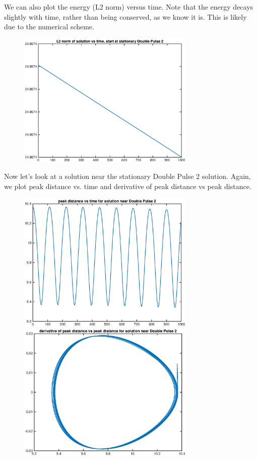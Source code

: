 \documentclass[12pt]{article}
\begin{document}
We can also plot the energy (L2 norm) versus time. Note that the energy decays slightly with time, rather than being conserved, as we know it is. This is likely due to the numerical scheme.

\begin{figure}[H]
	\includegraphics[width=8.5cm]{stat1a_norm}
\end{figure}

Now let's look at a solution near the stationary Double Pulse 2 solution. Again, we plot peak distance vs. time and derivative of peak distance vs peak distance.
\begin{figure}[H]
	\includegraphics[width=8.5cm]{1a2dist}
	\includegraphics[width=8.5cm]{1a2deriv}
\end{figure}
\end{document}
